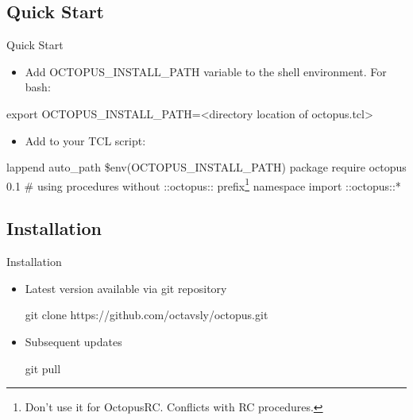 \documentclass[handout]{beamer}
\begin{document}
\subsection{Quick Start}
\begin{frame}[fragile]{Quick Start}
	\begin{itemize}
	\item Add OCTOPUS\_INSTALL\_PATH variable to the shell environment. For bash:
	\end{itemize}
	{\small
	\begin{semiverbatim}
\alert{export OCTOPUS_INSTALL_PATH=<directory location of octopus.tcl>}
	\end{semiverbatim}
	}
	\begin{itemize}
	\item Add to your TCL script:
	\end{itemize}
	{\small
	\begin{semiverbatim}
\alert{lappend auto_path \$env(OCTOPUS_INSTALL_PATH)}
\alert{package require octopus   0.1}
# using procedures without ::octopus:: prefix\footnote[1]{\tiny{Don't use it for OctopusRC. Conflicts with RC procedures.}}
namespace import ::octopus::*
	\end{semiverbatim}
	}
\end{frame}

\subsection{Installation}
\begin{frame}[fragile]{Installation}
	\begin{itemize}
	\item<1-> Latest version available via git repository \\
	\begin{semiverbatim}
	\alert{git clone https://github.com/octavsly/octopus.git}
	\end{semiverbatim}
	\item<2-> Subsequent updates 
	\begin{semiverbatim}
	\alert{git pull}
	\end{semiverbatim}
	\end{itemize}
\end{frame}
\end{document}
